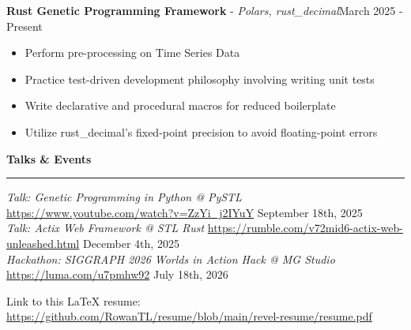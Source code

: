 \documentclass[11pt]{article}
\begin{document}
\textbf{Rust Genetic Programming Framework} - \textsl{Polars, rust\_decimal}\hfill March 2025 - Present
\begin{itemize}[noitemsep, topsep=0pt, partopsep=0pt, parsep=0pt, itemsep=0pt]
    \small
    \item Perform pre-processing on Time Series Data
    \item Practice test-driven development philosophy involving writing unit tests
    \item Write declarative and procedural macros for reduced boilerplate
    \item Utilize rust\_decimal's fixed-point precision to avoid floating-point errors
\end{itemize}

\textbf{Talks \& Events}\par
\vspace{-12pt}
\noindent\rule{\textwidth}{0.4pt}

\textsl{Talk: Genetic Programming in Python @ PySTL} \tiny{\href{https://www.youtube.com/watch?v=ZzYi\_j2IYuY}{https://www.youtube.com/watch?v=ZzYi\_j2IYuY}} \hfill \normalsize{September 18th, 2025}\\
\textsl{Talk: Actix Web Framework @ STL Rust} \tiny{\href{https://rumble.com/v72mid6-actix-web-unleashed.html}{https://rumble.com/v72mid6-actix-web-unleashed.html}} \hfill \normalsize{December 4th, 2025} \\
\textsl{Hackathon: SIGGRAPH 2026 Worlds in Action Hack @ MG Studio} \tiny{\href{https://luma.com/u7pmhw92}{https://luma.com/u7pmhw92}} \hfill \normalsize{July 18th, 2026}


\begin{center}
    \tiny{Link to this LaTeX resume: \href{https://github.com/RowanTL/resume/blob/main/revel-resume/resume.pdf}{https://github.com/RowanTL/resume/blob/main/revel-resume/resume.pdf}}
\end{center}
\end{document}
